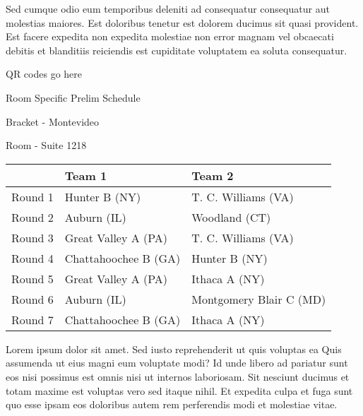 \documentclass{article}%
\begin{document}
\newline%
Sed cumque odio eum temporibus deleniti ad consequatur consequatur aut molestias maiores. Est doloribus tenetur est dolorem ducimus sit quasi provident. Est facere expedita non expedita molestiae non error magnam vel obcaecati debitis et blanditiis reiciendis est cupiditate voluptatem ea soluta consequatur.%
\vspace*{140pt}%
\begin{center}%
\begin{Huge}%
QR codes go here%
\end{Huge}%
\end{center}%
\newpage%
\begin{center}%
\begin{Huge}%
Room Specific Prelim Schedule%
\end{Huge}%
\vspace*{8pt}%
\linebreak%
\begin{Large}%
Bracket {-} Montevideo%
\end{Large}%
\vspace*{8pt}%
\linebreak%
\vspace*{8pt}%
\begin{Large}%
Room {-} Suite 1218%
\end{Large}%
\end{center}%
%
\begin{tabularx}{\textwidth}{|c|Y|Y|}%
\hline%
&Team 1&Team 2\\%
\hline%
Round 1&Hunter B (NY)&T. C. Williams (VA)\\%
Round 2&Auburn (IL)&Woodland (CT)\\%
Round 3&Great Valley A (PA)&T. C. Williams (VA)\\%
Round 4&Chattahoochee B (GA)&Hunter B (NY)\\%
Round 5&Great Valley A (PA)&Ithaca A (NY)\\%
Round 6&Auburn (IL)&Montgomery Blair C (MD)\\%
Round 7&Chattahoochee B (GA)&Ithaca A (NY)\\%
\hline%
\end{tabularx}%
\vspace*{8pt}%
\newline%
Lorem ipsum dolor sit amet. Sed iusto reprehenderit ut quis voluptas ea Quis assumenda ut eius magni eum voluptate modi? Id unde libero ad pariatur sunt eos nisi possimus est omnis nisi ut internos laboriosam. Sit nesciunt ducimus et totam maxime est voluptas vero sed itaque nihil. Et expedita culpa et fuga sunt quo esse ipsam eos doloribus autem rem perferendis modi et molestiae vitae.\newline%
\end{document}
